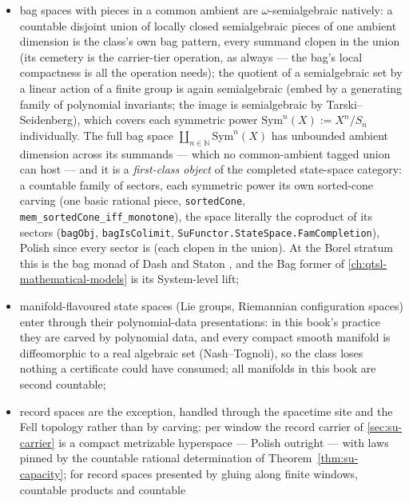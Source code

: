 \begin{definition}
\begin{itemize}
{  and second countable, Polish twice over; per-sector local
  closedness is the certificate, and the disjoint union inherits
  both properties with every summand clopen.}
\item bag spaces with pieces in a common ambient are
  $\omega$-semialgebraic natively:
  a countable disjoint union of locally closed semialgebraic pieces
  of one ambient dimension
  is the class's own bag pattern, every summand clopen in the union
  (its cemetery is the carrier-tier operation, as always --- the
  bag's local compactness is all the operation needs); the quotient
  of a semialgebraic set by
  a linear action of a finite group is again semialgebraic (embed by
  a generating family of polynomial invariants; the image is
  semialgebraic by Tarski--Seidenberg), which covers each symmetric
  power $\mathrm{Sym}^n(X) := X^n / S_n$ individually. The full bag
  space $\coprod_{n \in \mathbb{N}} \mathrm{Sym}^n(X)$ has
  unbounded ambient dimension across its summands --- which no
  common-ambient tagged union can host --- and it is a
  \emph{first-class object} of the completed state-space category:
  a countable family of sectors, each symmetric power its own
  sorted-cone carving (one basic rational piece,
  \texttt{sortedCone}, \texttt{mem\_sortedCone\_iff\_monotone}),
  the space literally the coproduct of its sectors
  (\texttt{bagObj}, \texttt{bagIsColimit},
  \texttt{SuFunctor.StateSpace.FamCompletion}), Polish since every
  sector is (each clopen in the union). At the
  Borel stratum this is the bag monad of Dash and Staton
  \cite{dash21}, and the Bag former of
  \autoref{ch:qtsl-mathematical-models} is its System-level lift;
\item manifold-flavoured state spaces (Lie groups, Riemannian
  configuration spaces) enter through their polynomial-data
  presentations: in this book's practice they are carved by
  polynomial data, and every compact smooth manifold is
  diffeomorphic to a real algebraic set (Nash--Tognoli), so the
  class loses nothing a certificate could have consumed; all
  manifolds in this book are second countable;
\item record spaces are the exception, handled through the
  spacetime site and the Fell topology rather than by carving: per
  window the record carrier of \autoref{sec:su-carrier} is a
  compact metrizable hyperspace --- Polish outright --- with laws
  pinned by the countable rational determination of
  Theorem~\ref{thm:su-capacity}; for record spaces presented by
  gluing along finite windows, countable products and countable

\end{itemize}
\end{definition}
